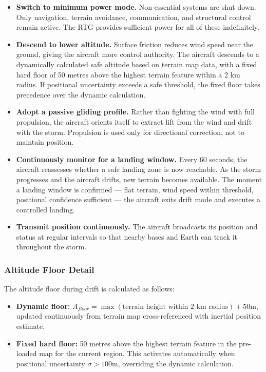 \documentclass[a4paper,12pt]{article}
\begin{document}
\begin{itemize}[itemsep=0.3em]
    \item \textbf{Switch to minimum power mode.} Non-essential systems are shut down.
    Only navigation, terrain avoidance, communication, and structural control remain active.
    The RTG provides sufficient power for all of these indefinitely.

    \item \textbf{Descend to lower altitude.} Surface friction reduces wind speed near the ground,
    giving the aircraft more control authority. The aircraft descends to a dynamically calculated
    safe altitude based on terrain map data, with a fixed hard floor of 50 metres above the
    highest terrain feature within a 2 km radius. If positional uncertainty exceeds a safe
    threshold, the fixed floor takes precedence over the dynamic calculation.

    \item \textbf{Adopt a passive gliding profile.} Rather than fighting the wind with full
    propulsion, the aircraft orients itself to extract lift from the wind and drift with the
    storm. Propulsion is used only for directional correction, not to maintain position.

    \item \textbf{Continuously monitor for a landing window.} Every 60 seconds, the aircraft
    reassesses whether a safe landing zone is now reachable. As the storm progresses and
    the aircraft drifts, new terrain becomes available. The moment a landing window is
    confirmed — flat terrain, wind speed within threshold, positional confidence sufficient
    — the aircraft exits drift mode and executes a controlled landing.

    \item \textbf{Transmit position continuously.} The aircraft broadcasts its position and
    status at regular intervals so that nearby bases and Earth can track it throughout the storm.
\end{itemize}

\subsubsection*{Altitude Floor Detail}
The altitude floor during drift is calculated as follows:

\begin{itemize}[itemsep=0.3em]
    \item \textbf{Dynamic floor:} $A_{floor} = \max(\text{terrain height within 2 km radius}) + 50\text{m}$,
    updated continuously from terrain map cross-referenced with inertial position estimate.

    \item \textbf{Fixed hard floor:} 50 metres above the highest terrain feature in the
    pre-loaded map for the current region. This activates automatically when positional
    uncertainty $\sigma > 100\text{m}$, overriding the dynamic calculation.
\end{itemize}
\end{document}
